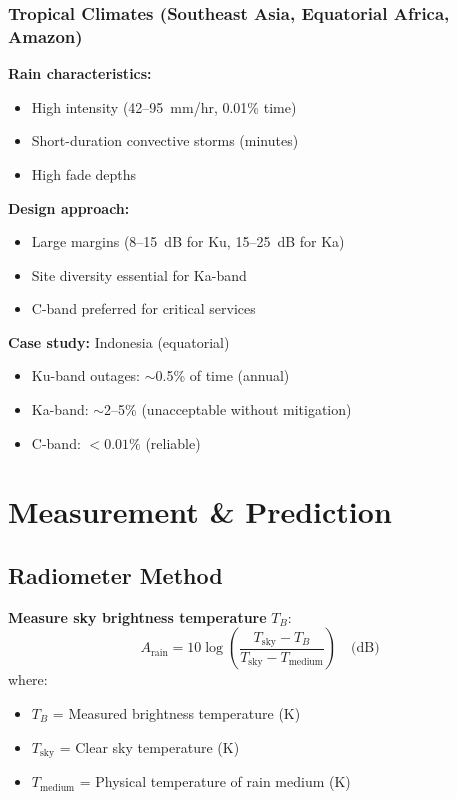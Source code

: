 \subsubsection{Tropical Climates (Southeast Asia, Equatorial Africa, Amazon)}

\textbf{Rain characteristics:}
\begin{itemize}
\item High intensity (42--95~mm/hr, 0.01\% time)
\item Short-duration convective storms (minutes)
\item High fade depths
\end{itemize}

\textbf{Design approach:}
\begin{itemize}
\item Large margins (8--15~dB for Ku, 15--25~dB for Ka)
\item Site diversity essential for Ka-band
\item C-band preferred for critical services
\end{itemize}

\textbf{Case study:} Indonesia (equatorial)
\begin{itemize}
\item Ku-band outages: $\sim$0.5\% of time (annual)
\item Ka-band: $\sim$2--5\% (unacceptable without mitigation)
\item C-band: $< 0.01\%$ (reliable)
\end{itemize}

\section{Measurement \& Prediction}

\subsection{Radiometer Method}

\textbf{Measure sky brightness temperature} $T_B$:
\begin{equation}
A_{\text{rain}} = 10 \log\left(\frac{T_{\text{sky}} - T_B}{T_{\text{sky}} - T_{\text{medium}}}\right) \quad \text{(dB)}
\end{equation}
where:
\begin{itemize}
\item $T_B$ = Measured brightness temperature (K)
\item $T_{\text{sky}}$ = Clear sky temperature (K)
\item $T_{\text{medium}}$ = Physical temperature of rain medium (K)
\end{itemize}

